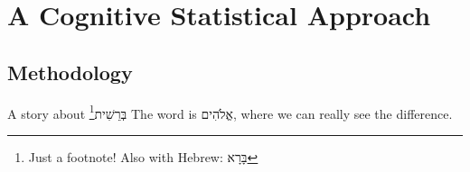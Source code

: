 
\chapter{A Cognitive Statistical Approach}  %



\section{Methodology}

A story about \texthebrew{בְּרֵשִׁית}\footnote{Just a footnote! Also with Hebrew: \texthebrew{בָּרָא}}
The word is \texthebrew{אֱלֹהִים}, where we can really see the difference.